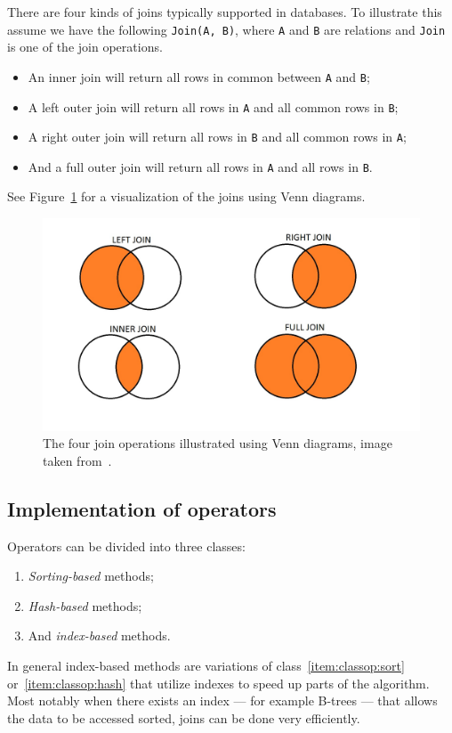 There are four kinds of joins typically supported in databases. To illustrate
this assume we have the following \texttt{Join(A, B)}, where \texttt{A} and
\texttt{B} are relations and \texttt{Join} is one of the join operations.
\begin{itemize}
\item An inner join will return all rows in common between \texttt{A} and
  \texttt{B};
\item A left outer join will return all rows in \texttt{A} and all common rows
  in \texttt{B};
\item A right outer join will return all rows in \texttt{B} and all common rows
  in \texttt{A};
\item And a full outer join will return all rows in \texttt{A} and all rows in
  \texttt{B}.
\end{itemize}
See Figure~\ref{fig:vennjoin} for a visualization of the joins using Venn
diagrams.

\begin{figure}[ht]
  \includegraphics[scale=0.4]{Images/SQL-Join-Venn-Diagrams.jpg}
  \caption[Illustration of join operations using Venn diagrams]{The four join
    operations illustrated using Venn diagrams, image taken
    from~\cite{brian_2014_better_bqj}.}\label{fig:vennjoin}
\end{figure}

\subsection{Implementation of operators}\label{sec:opimpl}
Operators can be divided into three classes:
\begin{enumerate}
\item\label{item:classop:sort} \textit{Sorting-based} methods;
\item\label{item:classop:hash} \textit{Hash-based} methods;
\item\label{item:classop:index} And \textit{index-based} methods.
\end{enumerate}
In general index-based methods are variations of class~\ref{item:classop:sort}
or~\ref{item:classop:hash} that utilize indexes to speed up parts of the
algorithm. Most notably when there exists an index --- for example B-trees ---
that allows the data to be accessed sorted, joins can be done very efficiently.

